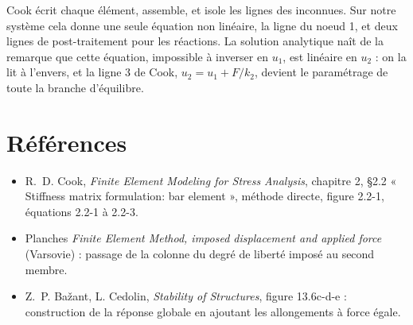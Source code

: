 \documentclass[11pt,a4paper]{article}
\begin{document}
\begin{idee}
Cook écrit chaque élément, assemble, et isole les lignes des inconnues. Sur notre système
cela donne une seule équation non linéaire, la ligne du noeud 1, et deux lignes de
post-traitement pour les réactions. La solution analytique naît de la remarque que cette
équation, impossible à inverser en $u_1$, est linéaire en $u_2$ : on la lit à l'envers, et la
ligne 3 de Cook, $u_2 = u_1 + F/k_2$, devient le paramétrage de toute la branche d'équilibre.
\end{idee}

\section*{Références}
\begin{itemize}[nosep]
  \item R.~D. Cook, \emph{Finite Element Modeling for Stress Analysis}, chapitre 2, §2.2
        « Stiffness matrix formulation: bar element », méthode directe, figure 2.2-1,
        équations 2.2-1 à 2.2-3.
  \item Planches \emph{Finite Element Method, imposed displacement and applied force}
        (Varsovie) : passage de la colonne du degré de liberté imposé au second membre.
  \item Z.~P. Bažant, L. Cedolin, \emph{Stability of Structures}, figure 13.6c-d-e :
        construction de la réponse globale en ajoutant les allongements à force égale.
\end{itemize}
\end{document}
